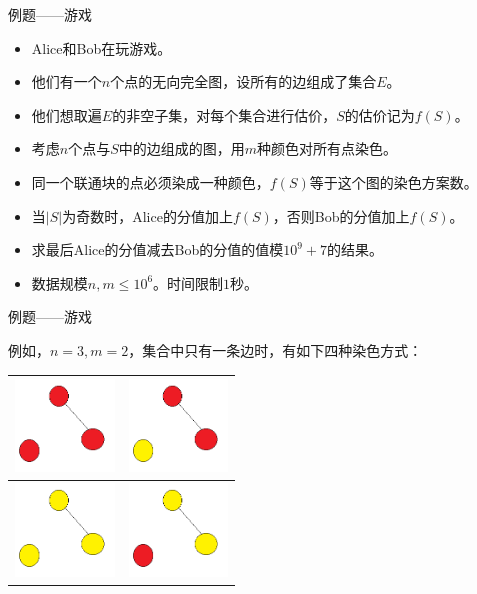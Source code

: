 \documentclass[allowframebreaks,9pt]{beamer}
\begin{document}
\begin{frame}{例题——游戏}

\begin{problem}
\begin{itemize}
\item {\color<2>{red}Alice和Bob在玩游戏。}
\item {他们有一个$n$个点的无向完全图，设所有的边组成了集合$E$。}
\item {他们想取遍$E$的非空子集，对每个集合进行估价，$S$的估价记为$f(S)$。}
\item {考虑$n$个点与$S$中的边组成的图，用$m$种颜色对所有点染色。}
\item {同一个联通块的点必须染成一种颜色，$f(S)$等于这个图的染色方案数。}
\item {当$|S|$为奇数时，Alice的分值加上$f(S)$，否则Bob的分值加上$f(S)$。}
\item {\color<8>{red}求最后Alice的分值减去Bob的分值的值模$10^9+7$的结果。}
\item {数据规模$n,m \le 10^6$。时间限制$1$秒。}
\end{itemize}
\end{problem}

\end{frame}

\begin{frame}{例题——游戏}

例如，$n=3,m=2$，集合中只有一条边时，有如下四种染色方式：

\begin{center}
\begin{tabular}{c|c}
\includegraphics[height=70pt]{game_0.png} & \includegraphics[height=70pt]{game_1.png} \\ \hline
\includegraphics[height=70pt]{game_2.png} & \includegraphics[height=70pt]{game_3.png} \\
\end{tabular}
\end{center}

\end{frame}
\end{document}
